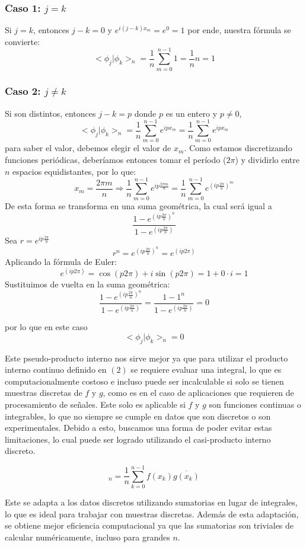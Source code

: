 \documentclass{article}
\begin{document}
\subsubsection{Caso 1: $ j = k$}
 Si $j = k$, entonces $j-k = 0$ y  $e^{i(j-k)x_m} = e^0 = 1$
por ende, nuestra fórmula se convierte: 
\[<\phi_j| \phi_k >_n = \frac{1}{n}\sum_{m=0}^{n-1}1 = \frac{1}{n}n = 1
\]
\subsubsection{Caso 2: $ j \neq k$}
Si son distintos, entonces $j-k = p$ donde $p$ es un entero y $p \neq 0$,
\[<\phi_j| \phi_k >_n = \frac{1}{n}\sum_{m=0}^{n-1}e^{ipx_m} =  \frac{1}{n}\sum_{m=0}^{n-1}e^{ipx_m}\]
para saber el valor, debemos elegir el valor de $x_m$. Como estamos discretizando funciones periódicas, deberíamos entonces tomar el período ($2\pi$) y dividirlo entre $n$ espacios equidistantes, por lo que:
\[x_m = \frac{2\pi m}{n} \Rightarrow \frac{1}{n}\sum_{m=0}^{n-1}e^{ip\frac{2\pi m}{n}} =\frac{1}{n}\sum_{m=0}^{n-1}e^{(ip\frac{2\pi}{n})^m}  \]
De esta forma se transforma en una suma geométrica, la cual será igual a 
\[\frac{1-e^{(ip\frac{2\pi}{n})^n}}{1-e^{(ip\frac{2\pi}{n})}}\]
Sea $r = e^{ip\frac{2\pi }{n}}$
\[ r^n = e^{(ip\frac{2\pi}{n})^n} =  e^{(ip2\pi)}\]
Aplicando la fórmula de Euler:
\[e^{(ip2\pi)} = \cos(p2\pi)+i\sin(p2\pi) = 1 + 0\cdot i = 1\]
Sustituimos de vuelta en la suma geométrica:
\[\frac{1-e^{(ip\frac{2\pi}{n})^n}}{1-e^{(ip\frac{2\pi}{n})}} = \frac{1-1^n}{1-e^{(ip\frac{2\pi}{n})}} = 0\]

por lo que en este caso
\[<\phi_j| \phi_k >_n = 0\]


Este pseudo-producto interno nos sirve mejor ya que para utilizar el producto interno continuo definido en  $(2)$ se requiere evaluar una integral, lo que es computacionalmente costoso e incluso puede ser incalculable si solo se tienen muestras discretas de $f$ y $g$, como es en el caso de aplicaciones que requieren de procesamiento de señales. Este solo es aplicable si \(f\) y \(g\) son funciones continuas o integrables, lo que no siempre se cumple en datos que son discretos o son experimentales. 
Debido a esto, buscamos una forma de poder evitar estas limitaciones, lo cual puede ser logrado utilizando el casi-producto interno discreto. 

\[<f|g>_n = \frac{1}{n}\sum_{k=0}^{n-1}f(x_k)\overline{g(x_k)}\]


Este se adapta a los datos discretos utilizando sumatorias en lugar de integrales, lo que es ideal para trabajar con muestras discretas. Además de esta adaptación, se obtiene mejor eficiencia computacional ya que las sumatorias son triviales de calcular numéricamente, incluso para grandes $n$.
\end{document}
